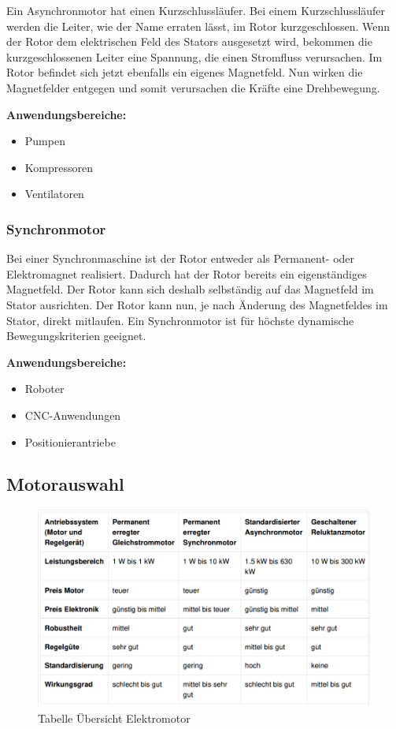 Ein Asynchronmotor hat einen Kurzschlussläufer.
Bei einem Kurzschlussläufer werden die Leiter, wie der Name erraten lässt, im Rotor kurzgeschlossen. Wenn der Rotor dem elektrischen Feld des Stators ausgesetzt wird, bekommen die kurzgeschlossenen Leiter eine Spannung, die einen Stromfluss verursachen. Im Rotor befindet sich jetzt ebenfalls ein eigenes Magnetfeld. Nun wirken die Magnetfelder entgegen und somit verursachen die Kräfte eine Drehbewegung. 

\textbf{Anwendungsbereiche:}

\begin{itemize}
	\item{Pumpen}
	\item{Kompressoren}
	\item{Ventilatoren}
\end{itemize}

\subsubsection{Synchronmotor}
\label{sec:synchronmotor}

Bei einer Synchronmaschine ist der Rotor entweder als Permanent- oder Elektromagnet realisiert. Dadurch hat der Rotor bereits ein eigenständiges Magnetfeld. Der Rotor kann sich deshalb selbständig auf das Magnetfeld im Stator ausrichten. Der Rotor kann nun, je nach Änderung des Magnetfeldes im Stator, direkt mitlaufen. Ein Synchronmotor ist für höchste dynamische Bewegungskriterien geeignet. 

\textbf{Anwendungsbereiche:}

\begin{itemize}
	\item{Roboter}
	\item{CNC-Anwendungen}
	\item{Positionierantriebe}
\end{itemize}

\subsection{Motorauswahl}
\label{sec:motorauswahl}

\begin{figure}[!ht]
\begin{center}
	\caption{Tabelle Übersicht Elektromotor \label{fig:ueberschichtElektromotor}}
	\includegraphics[width=1\textwidth]{TabelleMotor}
\end{center}
\end{figure}

